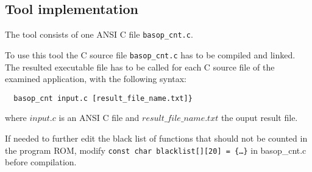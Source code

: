\subsection{Tool implementation}
The tool consists of one ANSI C file {\tt basop\_cnt.c}. 

To use this tool the C source file {\tt basop\_cnt.c} has to be
compiled and linked. The resulted executable file has to be called for
each C source file of the examined application, with the following
syntax:
\begin{verbatim}
  basop_cnt input.c [result_file_name.txt]}
\end{verbatim}
where $input.c$ is an ANSI C file and $result\_file\_name.txt$ the
ouput result file.

If needed to further edit the black list of functions that should not
be counted in the program ROM, modify {\tt const char blacklist[][20]
= \{{\dots}\}} in basop\_cnt.c before compilation.


